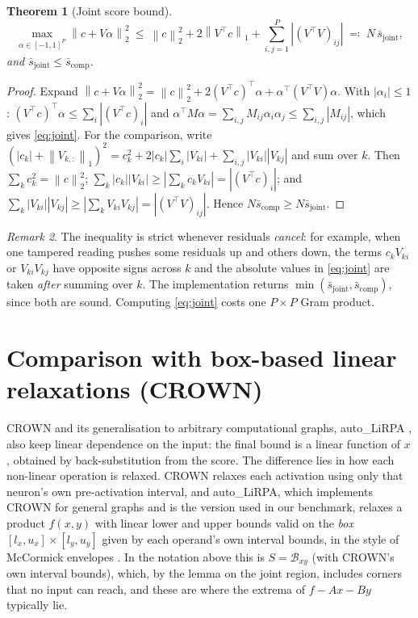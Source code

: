 \documentclass[11pt]{article}
\newtheorem{theorem}{Theorem}
\theoremstyle{definition}
\theoremstyle{remark}
\newtheorem{remark}[theorem]{Remark}
\newcommand{\Bx}{\mathcal{B}}
\newcommand{\abs}[1]{\left\lvert #1 \right\rvert}
\newcommand{\norm}[1]{\left\lVert #1 \right\rVert}
\begin{document}
\begin{theorem}[Joint score bound]
\label{thm:score}
\begin{equation}
\max_{\alpha\in[-1,1]^P}\norm{c+V\alpha}_2^2 \ \le\ \norm{c}_2^2 + 2\norm{V^\top c}_1 + \sum_{i,j=1}^{P}\abs{(V^\top V)_{ij}} \;\eqqcolon\; N\,\bar s_{\mathrm{joint}},
\label{eq:joint}
\end{equation}
and $\bar s_{\mathrm{joint}} \le \bar s_{\mathrm{comp}}$.
\end{theorem}
\begin{proof}
Expand $\norm{c+V\alpha}_2^2 = \norm{c}_2^2 + 2(V^\top c)^\top\alpha + \alpha^\top(V^\top V)\alpha$. With $\abs{\alpha_i}\le 1$: $(V^\top c)^\top\alpha \le \sum_i \abs{(V^\top c)_i}$ and $\alpha^\top M\alpha = \sum_{i,j} M_{ij}\alpha_i\alpha_j \le \sum_{i,j}\abs{M_{ij}}$, which gives \eqref{eq:joint}. For the comparison, write $(\abs{c_k} + \norm{V_{k,:}}_1)^2 = c_k^2 + 2\abs{c_k}\sum_i\abs{V_{ki}} + \sum_{i,j}\abs{V_{ki}}\abs{V_{kj}}$ and sum over $k$. Then $\sum_k c_k^2 = \norm{c}_2^2$; $\sum_k\abs{c_k}\abs{V_{ki}} \ge \abs{\sum_k c_kV_{ki}} = \abs{(V^\top c)_i}$; and $\sum_k\abs{V_{ki}}\abs{V_{kj}} \ge \abs{\sum_k V_{ki}V_{kj}} = \abs{(V^\top V)_{ij}}$. Hence $N\bar s_{\mathrm{comp}} \ge N\bar s_{\mathrm{joint}}$.
\end{proof}

\begin{remark}
The inequality is strict whenever residuals \emph{cancel}: for example, when one tampered reading pushes some residuals up and others down, the terms $c_kV_{ki}$ or $V_{ki}V_{kj}$ have opposite signs across $k$ and the absolute values in \eqref{eq:joint} are taken \emph{after} summing over $k$. The implementation returns $\min(\bar s_{\mathrm{joint}}, \bar s_{\mathrm{comp}})$, since both are sound. Computing \eqref{eq:joint} costs one $P\times P$ Gram product.
\end{remark}

\section{Comparison with box-based linear relaxations (CROWN)}

CROWN \cite{zhang2018crown} and its generalisation to arbitrary computational graphs, auto\_LiRPA \cite{xu2020autolirpa}, also keep linear dependence on the input: the final bound is a linear function of $x$, obtained by back-substitution from the score. The difference lies in how each non-linear operation is relaxed. CROWN relaxes each activation using only that neuron's own pre-activation interval, and auto\_LiRPA, which implements CROWN for general graphs and is the version used in our benchmark, relaxes a product $f(x,y)$ with linear lower and upper bounds valid on the \emph{box} $[l_x,u_x]\times[l_y,u_y]$ given by each operand's own interval bounds, in the style of McCormick envelopes \cite{mccormick1976}. In the notation above this is $S = \Bx_{xy}$ (with CROWN's own interval bounds), which, by the lemma on the joint region, includes corners that no input can reach, and these are where the extrema of $f - Ax - By$ typically lie.
\end{document}
